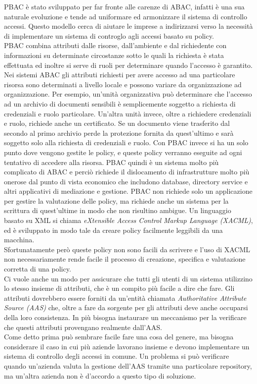 PBAC è stato sviluppato per far fronte alle carenze di ABAC, infatti è una sua naturale evoluzione e tende ad uniformare ed armonizzare il sistema di controllo accessi.
Questo modello cerca di aiutare le imprese a indirizzarsi verso la necessità di implementare un sistema di controglo agli accessi basato su policy.\\
PBAC combina attributi dalle risorse, dall'ambiente e dal richiedente con informazioni su determinate circostanze sotto le quali la richiesta è stata effettuata ed inoltre si serve di 
ruoli per determinare quando l'accesso è garantito.\\
Nei sistemi ABAC gli attributi richiesti per avere accesso ad una particolare risorsa sono determinati a livello locale e possono variare da organizzazione ad organizzazione.
Per esempio, un'unità organizzativa può determinare che l'accesso ad un archivio di documenti sensibili è semplicemente soggetto a richiesta di credenziali e ruolo particolare.
Un'altra unità invece, oltre a richiedere credenziali e ruolo, richiede anche un certificato. Se un documento viene trasferito dal secondo al primo archivio perde la protezione fornita da quest'ultimo e sarà soggetto solo alla richiesta di credenziali e ruolo.
Con PBAC invece si ha un solo punto dove vengono gestite le policy, e queste policy verranno eseguite ad ogni tentativo di accedere alla risorsa.
PBAC quindi è un sistema molto più complicato di ABAC e perciò richiede il dislocamento di infrastrutture molto più onerose dal punto di vista economico che includono database, directory service e altri applicativi di mediazione e gestione.
PBAC non richiede solo un applicazione per gestire la valutazione delle policy, ma richiede anche un sistema per la scrittura di quest'ultime in modo che non risultino ambigue.
Un linguaggio basato su XML si chiama \textit{eXtensible Access Control Markup Language (XACML)}, ed è sviluppato in modo tale da creare policy facilmente leggibili da una macchina.\\
Sfortunatamente però queste policy non sono facili da scrivere e l'uso di XACML non necessariamente rende facile il processo di creazione, specifica e valutazione corretta di una policy.\\
Ci vuole anche un modo per assicurare che tutti gli utenti di un sistema utilizzino lo stesso insieme di attributi, che è un compito più facile a dire che fare.
Gli attributi dovrebbero essere forniti da un'entità chiamata \textit{Authoritative Attribute Source (AAS)} che, oltre a fare da sorgente per gli attributi deve anche occuparsi della loro consistenza.
In più bisogna instaurare un meccanismo per la verificare che questi attributi provengano realmente dall'AAS.\\
Come detto prima può sembrare facile fare una cosa del genere, ma bisogna considerare il caso in cui più aziende lavorano insieme e devono implementare un sistema di controllo degli accessi in comune. Un problema si può verificare quando un'azienda valuta la gestione dell'AAS tramite una particolare repository, ma un'altra azienda non è d'accordo a questo tipo di soluzione.


